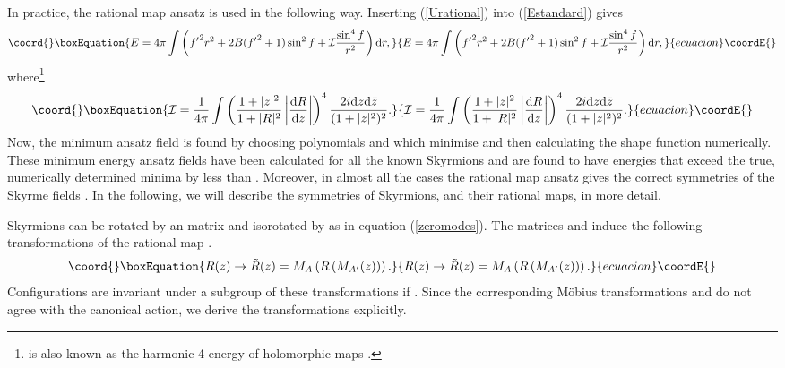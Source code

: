 \documentclass[a4paper,12pt]{article}
\begin{document}
In practice, the rational map ansatz is used in the following way.
Inserting (\ref{Urational}) into (\ref{Estandard}) gives 
%
\begin{equation}\coord{}\boxEquation{
\label{Erational}
E = 4 \pi \int  \left( {f^\prime}^2 r^2 + 2 B ({f^\prime}^2 + 1)
\sin^2 f  + {\cal I} \frac{\sin^4 f}{r^2} \right) {\rm d} r,
}{
E = 4 \pi \int  \left( {f^\prime}^2 r^2 + 2 B ({f^\prime}^2 + 1)
\sin^2 f  + {\cal I} \frac{\sin^4 f}{r^2} \right) {\rm d} r,
}{ecuacion}\coordE{}\end{equation}
%
where\footnote{\coordHE{} is also known as the harmonic 4-energy of 
holomorphic maps \coordHE{}.}
%
\begin{equation}\coord{}\boxEquation{
{\cal I} = \frac{1}{4 \pi} \int \left( \frac{1 + |z|^2}{1 +|R|^2}
\left|\frac{{\rm d} R}{{\rm d} z} \right| \right)^4 \frac{ 2 i {\rm
d}z {\rm d} {\bar z}}{(1+|z|^2)^2}.
}{
{\cal I} = \frac{1}{4 \pi} \int \left( \frac{1 + |z|^2}{1 +|R|^2}
\left|\frac{{\rm d} R}{{\rm d} z} \right| \right)^4 \frac{ 2 i {\rm
d}z {\rm d} {\bar z}}{(1+|z|^2)^2}.
}{ecuacion}\coordE{}\end{equation}
%
Now, the minimum ansatz field is found by choosing polynomials \coordHE{}
and  \coordHE{} which minimise \coordHE{} and then calculating the shape
function  \coordHE{} numerically.  These minimum energy ansatz fields have
been calculated for all the known Skyrmions and are found to have
energies that exceed the true, numerically determined minima by less
than \coordHE{}. Moreover, in almost all the cases the rational map ansatz
gives the correct symmetries of the Skyrme fields
\cite{Battye:2000se}. In the following, we will describe the symmetries of 
Skyrmions, and their rational maps, in more detail.

Skyrmions can be rotated by an \coordHE{} matrix \coordHE{} and isorotated 
by \coordHE{} as in equation (\ref{zeromodes}).
The matrices \coordHE{} and \coordHE{} induce the following 
transformations of the rational map \coordHE{}.
%
\begin{equation}\coord{}\boxEquation{
R(z) \to {\tilde R}(z) = M_A \left( R \left(M_{A^\prime}(z) \right) 
\right).
}{
R(z) \to {\tilde R}(z) = M_A \left( R \left(M_{A^\prime}(z) \right) 
\right).
}{ecuacion}\coordE{}\end{equation}
%
Configurations are invariant under a subgroup of these
transformations if \coordHE{}. 
Since the corresponding M\"obius transformations 
\coordHE{} and \coordHE{} do not agree with the canonical \coordHE{} action, 
we derive the transformations explicitly.
\end{document}
